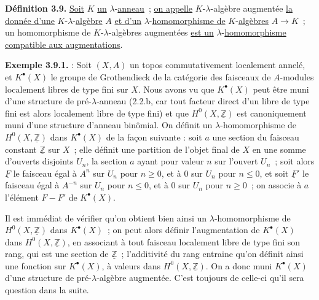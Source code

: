 
\textbf{Définition 3.9.} \uline{Soit} \(K\) \uline{un} \(\lambda\)-\uline{anneau}~; \uline{on appelle} \(K\)-\(\lambda\)-algèbre augmentée \uline{la donnée d'une} \(K\)-\(\lambda\)-\uline{algèbre} \(A\) \uline{et d'un} \(\lambda\)-\uline{homomorphisme de} \(K\)-\uline{algèbres} \(A\to K\)~; un homomorphisme de \(K\)-\(\lambda\)-algèbres augmentées \uline{est un} \(\lambda\)-\uline{homomorphisme compatible aux augmentations}.

\textbf{Exemple 3.9.1.} : Soit \((X,A)\) un topos commutativement localement annelé, et \(K^\bullet(X)\) le groupe de Grothendieck de la catégorie des faisceaux de \(A\)-modules localement libres de type fini sur \(X\). Nous avons vu que \(K^\bullet(X)\) peut être muni d'une structure de pré-\(\lambda\)-anneau (2.2.b, car tout facteur direct d'un libre de type fini est alors localement libre de type fini) et que \(H^0(X,\underline{\mathbb Z})\) est canoniquement muni d'une structure d'anneau binômial. On définit un \(\lambda\)-homomorphisme de \(H^0(X,\underline{\mathbb Z})\) dans \(K^\bullet(X)\) de la façon suivante : soit \(a\) une section du faisceau constant \(\underline{\mathbb Z}\) sur \(X\)~; elle définit une partition de l'objet final de \(X\) en une somme d'ouverts disjoints \(U_n\), la section \(a\) ayant pour valeur \(n\) sur l'ouvert \(U_n\)~; soit alors \(\underline{F}\) le faisceau égal à \(A^n\) sur \(U_n\) pour \(n\ge0\), et à \(0\) sur \(U_n\) pour \(n\le0\), et soit \(\underline{F}'\) le faisceau égal à \(A^{-n}\) sur \(U_n\) pour \(n\le0\), et à \(0\) sur \(U_n\) pour \(n\ge0\)~; on associe à \(a\) l'élément \(F-F'\) de \(K^\bullet(X)\).

Il est immédiat de vérifier qu'on obtient bien ainsi un \(\lambda\)-homomorphisme de \(H^0(X,\underline{\mathbb Z})\) dans \(K^\bullet(X)\)~; on peut alors définir l'augmentation de \(K^\bullet(X)\) dans \(H^0(X,\underline{\mathbb Z})\), en associant à tout faisceau localement libre de type fini son rang, qui est une section de \(\underline{\mathbb Z}\)~; l'additivité du rang entraine qu'on définit ainsi une fonction sur \(K^\bullet(X)\), à valeurs dans \(H^0(X,\underline{\mathbb Z})\). On a donc muni \(K^\bullet(X)\) d'une structure de pré-\(\lambda\)-algèbre augmentée. C'est toujours de celle-ci qu'il sera question dans la suite.

